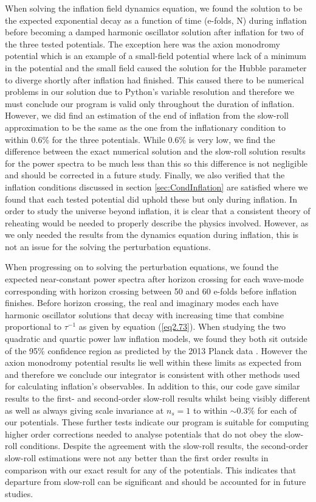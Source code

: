 \documentclass[a4paper,12pt,twoside]{report}
\begin{document}
When solving the inflation field dynamics equation, we found the solution to be the expected exponential decay as a function of time (e-folds, N) during inflation before becoming a damped harmonic oscillator solution after inflation for two of the three tested potentials. The exception here was the axion monodromy potential which is an example of a small-field potential where lack of a minimum in the potential and the small field caused the solution for the Hubble parameter to diverge shortly after inflation had finished. This caused there to be numerical problems in our solution due to Python's variable resolution and therefore we must conclude our program is valid only throughout the duration of inflation. However, we did find an estimation of the end of inflation from the slow-roll approximation to be the same as the one from the inflationary condition to within 0.6\% for the three potentials. While 0.6\% is very low, we find the difference between the exact numerical solution and the slow-roll solution results for the power spectra to be much less than this so this difference is not negligible and should be corrected in a future study. Finally, we also verified that the inflation conditions discussed in section \ref{sec:CondInflation} are satisfied where we found that each tested potential did uphold these but only during inflation. In order to study the universe beyond inflation, it is clear that a consistent theory of reheating would be needed to properly describe the physics involved. However, as we only needed the results from the dynamics equation during inflation, this is not an issue for the solving the perturbation equations.

When progressing on to solving the perturbation equations, we found the expected near-constant power spectra after horizon crossing for each wave-mode corresponding with horizon crossing between 50 and 60 e-folds before inflation finishes. Before horizon crossing, the real and imaginary modes each have harmonic oscillator solutions that decay with increasing time that combine proportional to $\tau^{-1}$ as given by equation (\ref{eq2.73}). When studying the two quadratic and quartic power law inflation models, we found they both sit outside of the 95\% confidence region as predicted by the 2013 Planck data \cite{Planck:2013jfk}. However the axion monodromy potential results lie well within these limits as expected from \cite{Burgess:2013sla} and therefore we conclude our integrator is consistent with other methods used for calculating inflation's observables. In addition to this, our code gave similar results to the first- and second-order slow-roll results whilst being visibly different as well as always giving scale invariance at $n_{s} = 1$ to within $\sim$0.3\% for each of our potentials. These further tests indicate our program is suitable for computing higher order corrections needed to analyse potentials that do not obey the slow-roll conditions. Despite the agreement with the slow-roll results, the second-order slow-roll estimations were not any better than the first order results in comparison with our exact result for any of the potentials. This indicates that departure from slow-roll can be significant and should be accounted for in future studies.
\end{document}

